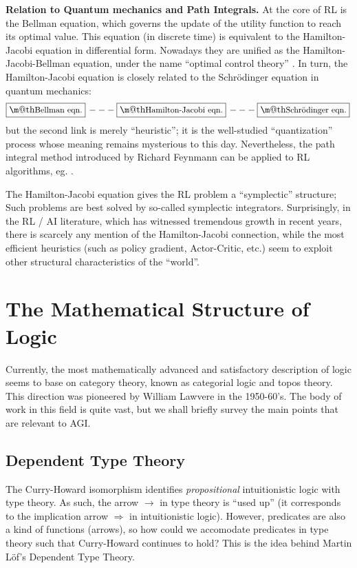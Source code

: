\documentclass[orivec]{llncs}
\makeatletter
\renewcommand{\boxed}[1]{\fbox{\m@th$\displaystyle\scalebox{0.9}{#1}$} \,}
\makeatother
\begin{document}
\textbf{Relation to Quantum mechanics and Path Integrals.}  At the core of RL is the Bellman equation, which governs the update of the utility function to reach its optimal value.  This equation (in discrete time) is equivalent to the Hamilton-Jacobi equation in differential form.  Nowadays they are unified as the Hamilton-Jacobi-Bellman equation, under the name ``optimal control theory'' \cite{Liberzon2012}.  In turn, the Hamilton-Jacobi equation is closely related to the Schr\"{o}dinger equation in quantum mechanics:
\begin{equation}
\boxed{\mbox{Bellman eqn.}} --- \boxed{\mbox{Hamilton-Jacobi eqn.}} --- \boxed{\mbox{Schr\"{o}dinger eqn.}}
\end{equation}
but the second link is merely ``heuristic'';  it is the well-studied ``quantization'' process whose meaning remains mysterious to this day.  Nevertheless, the path integral method introduced by Richard Feynmann can be applied to RL algorithms, eg. \cite{Kappen}.

The Hamilton-Jacobi equation gives the RL problem a ``symplectic'' structure;  Such problems are best solved by so-called symplectic integrators.  Surprisingly, in the RL / AI literature, which has witnessed tremendous growth in recent years, there is scarcely any mention of the Hamilton-Jacobi connection, while the most efficient heuristics (such as policy gradient, Actor-Critic, etc.) seem to exploit other structural characteristics of the ``world''.

\section{The Mathematical Structure of Logic}

Currently, the most mathematically advanced and satisfactory description of logic seems to base on category theory, known as categorial logic and topos theory.  This direction was pioneered by William Lawvere in the 1950-60's.  The body of work in this field is quite vast, but we shall briefly survey the main points that are relevant to AGI.

\subsection{Dependent Type Theory}

The Curry-Howard isomorphism identifies \textit{propositional} intuitionistic logic with type theory.  As such, the arrow $\rightarrow$ in type theory is ``used up'' (it corresponds to the implication arrow $\Rightarrow$ in intuitionistic logic).  However, predicates are also a kind of functions (arrows), so how could we accomodate predicates in type theory such that Curry-Howard continues to hold?  This is the idea behind Martin L\"{o}f's Dependent Type Theory.
\end{document}
